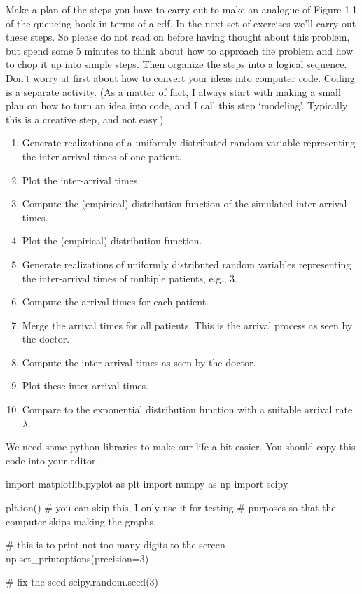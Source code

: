 \begin{exercise}
  Make a plan of the steps you have to carry out to make an analogue of Figure 1.1 of the queueing book in terms of a cdf.
  In the next set of exercises we'll carry out these steps.
  So please do not read on before having thought about this problem, but spend some 5 minutes to think about how to approach the problem and how to chop it up into simple steps.
  Then organize the steps into a logical sequence.
  Don't worry at first about how to convert your ideas into computer code.
  Coding is a separate activity.
  (As a matter of fact, I always start with making a small plan on how to turn an idea into code, and I call this step `modeling'.
  Typically this is a creative step, and not easy.)

\begin{solution}
    \begin{enumerate}
    \item Generate realizations of a uniformly distributed random variable representing the inter-arrival times of one patient.
    \item Plot the inter-arrival times.
    \item Compute the (empirical) distribution function of the simulated inter-arrival times.
    \item Plot the (empirical) distribution function.
    \item Generate realizations of uniformly distributed random variables representing the inter-arrival times of multiple patients, e.g., 3.
    \item Compute the arrival times for each patient.
    \item Merge  the arrival times for all patients. This is the arrival process as seen by the doctor.
    \item Compute the inter-arrival times as seen by the doctor.
    \item Plot these inter-arrival times.
    \item Compare to the exponential distribution function with a suitable arrival rate $\lambda$.
    \end{enumerate}
\end{solution}
\end{exercise}

We need some python libraries to make our life a bit easier. You should copy this code into your editor.

\begin{pyverbatim}
import matplotlib.pyplot as plt
import numpy as np
import scipy

plt.ion()  # you can skip this, I only use it for testing
           # purposes so that the computer skips making the graphs.

# this is to print not too many digits to the screen
np.set_printoptions(precision=3)

# fix the seed
scipy.random.seed(3)
\end{pyverbatim}

